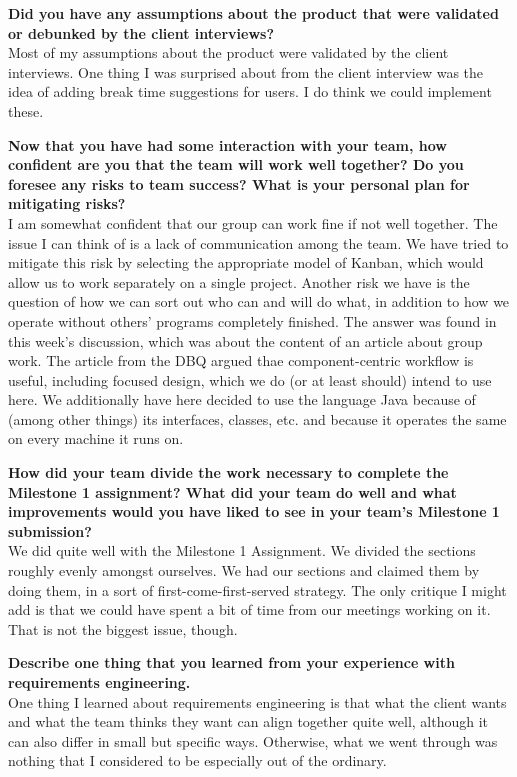 \documentclass[10pt]{article}
\begin{document}
\textbf{Did you have any assumptions about the product that were validated or debunked by the client interviews?}\\
Most of my assumptions about the product were validated by the client interviews. One thing I was surprised about from the client interview was the idea of adding break time suggestions for users. I do think we could implement these.

\textbf{Now that you have had some interaction with your team, how confident are you that the team will work well together? Do you foresee any risks to team success?  What is your personal plan for mitigating risks?}\\
I am somewhat confident that our group can work fine if not well together. The issue I can think of is a lack of communication among the team. We have tried to mitigate this risk by selecting the appropriate model of Kanban, which would allow us to work separately on a single project.
Another risk we have is the question of how we can sort out who can and will do what, in addition to how we operate without others' programs completely finished. The answer was found in this week's discussion, which was about the content of an article about group work. The article from the DBQ argued thae component-centric workflow is useful, including focused design, which we do (or at least should) intend to use here. We additionally have here decided to use the language Java because of (among other things) its interfaces, classes, etc. and because it operates the same on every machine it runs on.

\textbf{How did your team divide the work necessary to complete the Milestone 1 assignment?  What did your team do well and what improvements would you have liked to see in your team's Milestone 1 submission?}\\
We did quite well with the Milestone 1 Assignment. We divided the sections roughly evenly amongst ourselves. We had our sections and claimed them by doing them, in a sort of first-come-first-served strategy. The only critique I might add is that we could have spent a bit of time from our meetings working on it. That is not the biggest issue, though.

\textbf{Describe one thing that you learned from your experience with requirements engineering.}\\
One thing I learned about requirements engineering is that what the client wants and what the team thinks they want can align together quite well, although it can also differ in small but specific ways. Otherwise, what we went through was nothing that I considered to be especially out of the ordinary.
\end{document}
